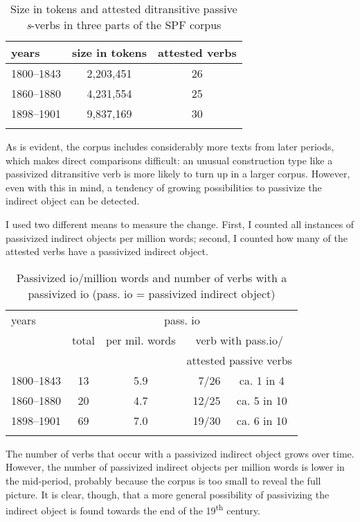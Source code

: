 \documentclass[output=paper]{langscibook}
\begin{document}
\begin{table}
\caption{Size in tokens and attested ditransitive passive \textit{s}{}-verbs in three parts of the SPF corpus\label{tab:falk:1}}
\begin{tabular}{lcc}
\lsptoprule
years & size in tokens & attested verbs\\\midrule
1800–1843 & 2,203,451 & 26\\
1860–1880 & 4,231,554 & 25\\
1898–1901 & 9,837,169 & 30\\
\lspbottomrule
\end{tabular}
\end{table}

As is evident, the corpus includes considerably more texts from later periods, which makes direct comparisons difficult: an unusual construction type like a passivized ditransitive verb is more likely to turn up in a larger corpus. However, even with this in mind, a tendency of growing possibilities to passivize the indirect object can be detected. 


I used two different means to measure the change. First, I counted all instances of passivized indirect objects per million words; second, I counted how many of the attested verbs have a passivized indirect object. 


\begin{table}
\caption{Passivized io/million words and number of verbs with a passivized io (pass. io = passivized indirect object)\label{tab:falk:2}}
\begin{tabular}{lccr@{}c}
\lsptoprule
years & \multicolumn{4}{c}{pass. io} \\\cmidrule(lr){2-5}
      & total & per mil. words & \multicolumn{2}{c}{verb with pass.io/}\\
      &       &                & \multicolumn{2}{c}{attested passive verbs}\\\midrule
1800–1843 & 13 & 5.9 & 7/26  & ca. 1 in 4 \\
1860–1880 & 20 & 4.7 & 12/25 & ca. 5 in 10\\
1898–1901 & 69 & 7.0 & 19/30 & ca. 6 in 10\\
\lspbottomrule
\end{tabular}
\end{table}

The number of verbs that occur with a passivized indirect object grows over time. However, the number of passivized indirect objects per million words is lower in the mid-period, probably because the corpus is too small to reveal the full picture. It is clear, though, that a more general possibility of passivizing the indirect object is found towards the end of the 19\textsuperscript{th} century.
\end{document}
